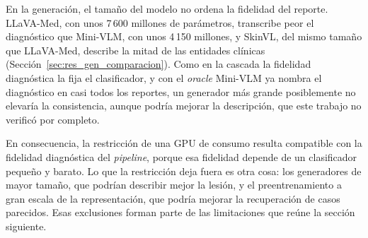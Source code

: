 En la generación, el tamaño del modelo no ordena la fidelidad del reporte. LLaVA-Med, con unos 7\,600 millones de
parámetros, transcribe peor el diagnóstico que Mini-VLM, con unos 4\,150 millones, y SkinVL, del mismo tamaño que
LLaVA-Med, describe la mitad de las entidades clínicas (Sección~\ref{sec:res_gen_comparacion}). Como en la cascada la
fidelidad diagnóstica la fija el clasificador, y con el \emph{oracle} Mini-VLM ya nombra el diagnóstico en casi todos
los reportes, un generador más grande posiblemente no elevaría la consistencia, aunque podría mejorar la descripción,
que este trabajo no verificó por completo.

En consecuencia, la restricción de una GPU de consumo resulta compatible con la fidelidad diagnóstica del
\emph{pipeline}, porque esa fidelidad depende de un clasificador pequeño y barato. Lo que la restricción deja fuera es
otra cosa: los generadores de mayor tamaño, que podrían describir mejor la lesión, y el preentrenamiento a gran escala
de la representación, que podría mejorar la recuperación de casos parecidos. Esas exclusiones forman parte de las
limitaciones que reúne la sección siguiente.
